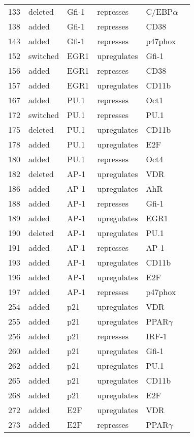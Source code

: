 \begin{center}
\begin{scriptsize}
\begin{supertabular}{|p{2 cm}|p{2cm}|p{3cm}|p{2.5cm}|p{2cm}|p{1.5cm}|}
133 &  deleted &  Gfi-1  & represses &  C/EBP$\alpha$ & \\
138 &  added &  Gfi-1  & represses &  CD38 & \\
143 &  added &  Gfi-1  & represses &  p47phox & \\
152 &  switched &  EGR1  & upregulates &  Gfi-1 & \\
156 &  added &  EGR1  & represses &  CD38 & \\
157 &  added &  EGR1  & upregulates &  CD11b & \\
167 &  added &  PU.1  & represses &  Oct1 & \\
172 &  switched &  PU.1  & represses &  PU.1 & \\
175 &  deleted &  PU.1  & upregulates &  CD11b & \\
178 &  added &  PU.1  & upregulates &  E2F & \\
180 &  added &  PU.1  & represses &  Oct4 & \\
182 &  deleted &  AP-1  & upregulates &  VDR & \\
186 &  added &  AP-1  & upregulates &  AhR & \\
188 &  added &  AP-1  & represses &  Gfi-1 & \\
189 &  added &  AP-1  & upregulates &  EGR1 & \\
190 &  deleted &  AP-1  & upregulates &  PU.1 & \\
191 &  added &  AP-1  & represses &  AP-1 & \\
193 &  added &  AP-1  & upregulates &  CD11b & \\
196 &  added &  AP-1  & upregulates &  E2F & \cite{Shen2008}\\
197 &  added &  AP-1  & represses &  p47phox & \\
254 &  added &  p21  & upregulates &  VDR & \\
255 &  added &  p21  & upregulates &  PPAR$\gamma$ & \\
256 &  added &  p21  & represses &  IRF-1 & \\
260 &  added &  p21  & upregulates &  Gfi-1 & \\
262 &  added &  p21  & upregulates &  PU.1 & \\
265 &  added &  p21  & upregulates &  CD11b & \\
268 &  added &  p21  & upregulates &  E2F & \\
272 &  added &  E2F  & upregulates &  VDR & \\
273 &  added &  E2F  & represses &  PPAR$\gamma$ & \\

\end{supertabular}
\end{scriptsize}
\end{center}
